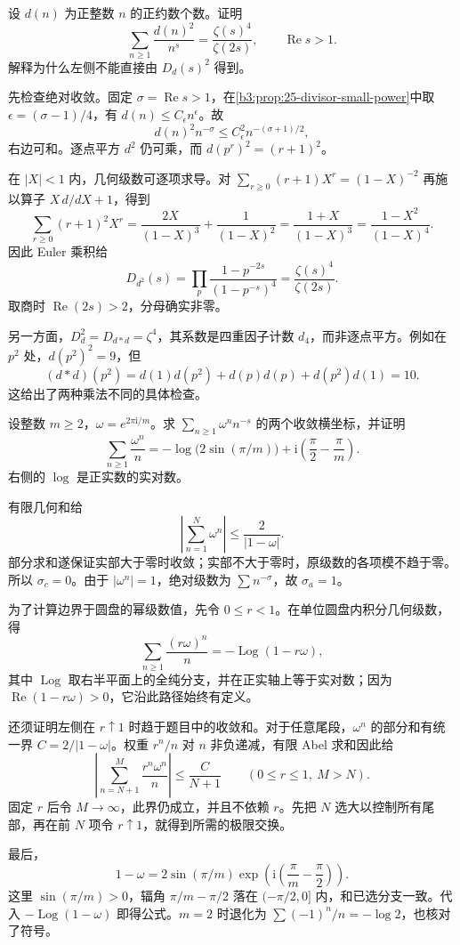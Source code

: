\begin{exercise}\label{b3:ex:25-5}
设 \(d(n)\) 为正整数 \(n\) 的正约数个数。证明
\[
 \sum_{n\ge1}\frac{d(n)^2}{n^s}
 =\frac{\zeta(s)^4}{\zeta(2s)},\qquad\operatorname{Re}s>1.
\]
解释为什么左侧不能直接由 \(D_d(s)^2\) 得到。
\end{exercise}
\begin{solution}
先检查绝对收敛。固定 \(\sigma=\operatorname{Re}s>1\)，在\cref{b3:prop:25-divisor-small-power}中取 \(\epsilon=(\sigma-1)/4\)，有 \(d(n)\le C_\epsilon n^\epsilon\)。故
\[
 d(n)^2n^{-\sigma}\le C_\epsilon^2 n^{-(\sigma+1)/2},
\]
右边可和。逐点平方 \(d^2\) 仍可乘，而 \(d(p^r)^2=(r+1)^2\)。

在 \(|X|<1\) 内，几何级数可逐项求导。对 \(\sum_{r\ge0}(r+1)X^r=(1-X)^{-2}\) 再施以算子 \(X\,d/dX+1\)，得到
\[
 \sum_{r\ge0}(r+1)^2X^r
 =\frac{2X}{(1-X)^3}+\frac1{(1-X)^2}
 =\frac{1+X}{(1-X)^3}
 =\frac{1-X^2}{(1-X)^4}.
\]
因此 Euler 乘积给
\[
 D_{d^2}(s)=\prod_p\frac{1-p^{-2s}}{(1-p^{-s})^4}
          =\frac{\zeta(s)^4}{\zeta(2s)}.
\]
取商时 \(\operatorname{Re}(2s)>2\)，分母确实非零。

另一方面，\(D_d^2=D_{d*d}=\zeta^4\)，其系数是四重因子计数 \(d_4\)，而非逐点平方。例如在 \(p^2\) 处，\(d(p^2)^2=9\)，但
\[
 (d*d)(p^2)=d(1)d(p^2)+d(p)d(p)+d(p^2)d(1)=10.
\]
这给出了两种乘法不同的具体检查。
\end{solution}

\begin{exercise}\label{b3:ex:25-6}
设整数 \(m\ge2\)，\(\omega=e^{2\pi\mathrm i/m}\)。求 \(\sum_{n\ge1}\omega^n n^{-s}\) 的两个收敛横坐标，并证明
\[
 \sum_{n\ge1}\frac{\omega^n}{n}
 =-\log\bigl(2\sin(\pi/m)\bigr)
   +\mathrm i\left(\frac\pi2-\frac\pi m\right).
\]
右侧的 \(\log\) 是正实数的实对数。
\end{exercise}
\begin{solution}
有限几何和给
\[
 \left|\sum_{n=1}^N\omega^n\right|\le\frac2{|1-\omega|}.
\]
部分求和遂保证实部大于零时收敛；实部不大于零时，原级数的各项模不趋于零。所以 \(\sigma_c=0\)。由于 \(|\omega^n|=1\)，绝对级数为 \(\sum n^{-\sigma}\)，故 \(\sigma_a=1\)。

为了计算边界于圆盘的幂级数值，先令 \(0\le r<1\)。在单位圆盘内积分几何级数，得
\[
 \sum_{n\ge1}\frac{(r\omega)^n}{n}=-\operatorname{Log}(1-r\omega),
\]
其中 \(\operatorname{Log}\) 取右半平面上的全纯分支，并在正实轴上等于实对数；因为
\(\operatorname{Re}(1-r\omega)>0\)，它沿此路径始终有定义。

还须证明左侧在 \(r\uparrow1\) 时趋于题目中的收敛和。对于任意尾段，\(\omega^n\) 的部分和有统一界 \(C=2/|1-\omega|\)。权重 \(r^n/n\) 对 \(n\) 非负递减，有限 Abel 求和因此给
\[
 \left|\sum_{n=N+1}^{M}\frac{r^n\omega^n}{n}\right|
 \le \frac{C}{N+1}\qquad(0\le r\le1,\ M>N).
\]
固定 \(r\) 后令 \(M\to\infty\)，此界仍成立，并且不依赖 \(r\)。先把 \(N\) 选大以控制所有尾部，再在前 \(N\) 项令 \(r\uparrow1\)，就得到所需的极限交换。

最后，
\[
 1-\omega=2\sin(\pi/m)
       \exp\left(\mathrm i\left(\frac\pi m-\frac\pi2\right)\right).
\]
这里 \(\sin(\pi/m)>0\)，辐角 \(\pi/m-\pi/2\) 落在 \((-\pi/2,0]\) 内，和已选分支一致。代入 \(-\operatorname{Log}(1-\omega)\) 即得公式。\(m=2\) 时退化为 \(\sum(-1)^n/n=-\log2\)，也核对了符号。
\end{solution}

